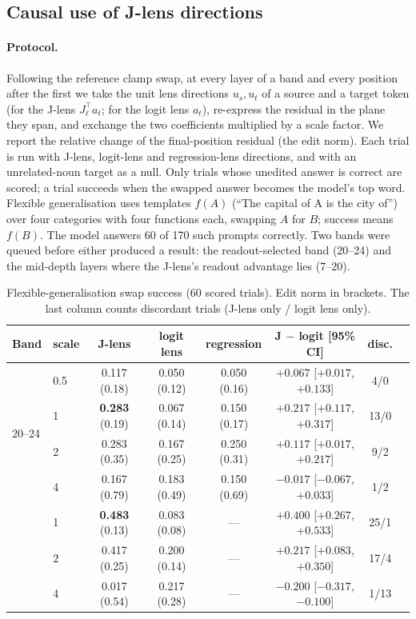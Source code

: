 \documentclass[11pt]{article}
\theoremstyle{definition}
\newcommand{\Jl}{J_{\ell}}
\begin{document}
\subsection{Causal use of J-lens directions}
\label{sec:swaps}

\paragraph{Protocol.} Following the reference clamp swap, at every layer of a band and every position
after the first we take the unit lens directions $u_s,u_t$ of a source and a target token (for the
J-lens $\Jl^{\top}a_t$; for the logit lens $a_t$), re-express the residual in the plane they span, and
exchange the two coefficients multiplied by a scale factor. We report the relative change of the
final-position residual (the edit norm). Each trial is run with J-lens, logit-lens and regression-lens
directions, and with an unrelated-noun target as a null. Only trials whose unedited answer is correct
are scored; a trial succeeds when the swapped answer becomes the model's top word. Flexible
generalisation uses templates $f(A)$ (``The capital of A is the city of'') over four categories with
four functions each, swapping $A$ for $B$; success means $f(B)$. The model answers 60 of 170 such
prompts correctly. Two bands were queued before either produced a result: the readout-selected band
(20--24) and the mid-depth layers where the J-lens's readout advantage lies (7--20).

\begin{table}[t]
\centering
\caption{Flexible-generalisation swap success (60 scored trials). Edit norm in brackets. The last
column counts discordant trials (J-lens only / logit lens only).}
\label{tab:swaps}
\small
\begin{tabular}{llcccccc}
\toprule
Band & scale & J-lens & logit lens & regression & J $-$ logit [95\% CI] & disc. \\
\midrule
\multirow{4}{*}{20--24} & 0.5 & 0.117 (0.18) & 0.050 (0.12) & 0.050 (0.16) & $+0.067$ [$+0.017$, $+0.133$] & 4/0 \\
 & 1 & \textbf{0.283} (0.19) & 0.067 (0.14) & 0.150 (0.17) & $+0.217$ [$+0.117$, $+0.317$] & 13/0 \\
 & 2 & 0.283 (0.35) & 0.167 (0.25) & 0.250 (0.31) & $+0.117$ [$+0.017$, $+0.217$] & 9/2 \\
 & 4 & 0.167 (0.79) & 0.183 (0.49) & 0.150 (0.69) & $-0.017$ [$-0.067$, $+0.033$] & 1/2 \\
\addlinespace
\multirow{3}{*}{7--20} & 1 & \textbf{0.483} (0.13) & 0.083 (0.08) & --- & $+0.400$ [$+0.267$, $+0.533$] & 25/1 \\
 & 2 & 0.417 (0.25) & 0.200 (0.14) & --- & $+0.217$ [$+0.083$, $+0.350$] & 17/4 \\
 & 4 & 0.017 (0.54) & 0.217 (0.28) & --- & $-0.200$ [$-0.317$, $-0.100$] & 1/13 \\
\bottomrule
\end{tabular}
\end{table}
\end{document}
